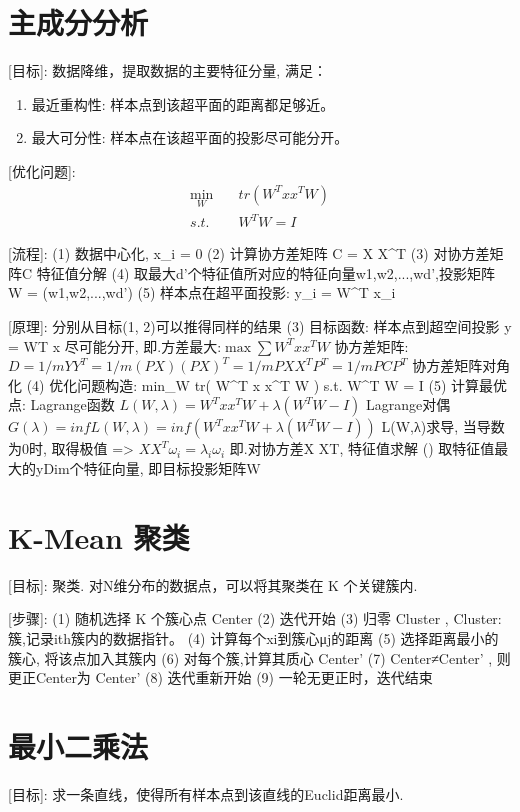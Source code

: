 \documentclass{article}
\title{}\date{} \setlength{\parindent}{0pt} \linespread{1.25}
\begin{document}
\section{主成分分析}
		[目标]:
			数据降维，提取数据的主要特征分量, 满足：
    			\begin{enumerate}
    			    \item 最近重构性: 样本点到该超平面的距离都足够近。
    			    \item 最大可分性: 样本点在该超平面的投影尽可能分开。
    			\end{enumerate}
			
		[优化问题]:
    		\begin{align*}
    			\min_W  &\quad	tr( W^T x x^T W )\\
    			s.t.    &\quad	W^T W = I
    		\end{align*}
			
		[流程]:
			(1) 数据中心化, \sum \vec x_i = 0
			(2) 计算协方差矩阵 C = X X^T
			(3) 对协方差矩阵C 特征值分解
			(4) 取最大d'个特征值所对应的特征向量{w1,w2,...,wd'},投影矩阵 W = (w1,w2,...,wd')
			(5) 样本点在超平面投影: y_i = W^T x_i
			
		[原理]:
				分别从目标(1, 2)可以推得同样的结果
			(3)	目标函数: 样本点到超空间投影 y = WT x 尽可能分开, 即.方差最大:$\max \sum W^T x x^T W$
				协方差矩阵:
					$D = 1/m Y Y^T = 1/m (PX) (PX)^T = 1/m P X X^T P^T = 1/m P C P^T$
				协方差矩阵对角化
			(4) 优化问题构造:
					min_W		tr( W^T x x^T W )
					s.t.		W^T W = I
			(5) 计算最优点:
				Lagrange函数 $L(W,λ) = W^T x x^T W + λ( W^T W - I )$
				Lagrange对偶 $G(λ) = inf L(W,λ) = inf (W^T x x^T W + λ( W^T W - I ))$
				L(W,λ)求导, 当导数为0时, 取得极值
				=>	$X X^T ω_i = λ_i ω_i$
				即.对协方差X XT, 特征值求解
			()	取特征值最大的yDim个特征向量, 即目标投影矩阵W


\section{K-Mean 聚类}
		[目标]:
			聚类. 对N维分布的数据点，可以将其聚类在 K 个关键簇内.
			
		[步骤]:
			(1) 随机选择 K 个簇心点 Center
			(2) 迭代开始
				(3) 归零 Cluster , Cluster: 簇,记录ith簇内的数据指针。
				(4) 计算每个xi到簇心μj的距离
					(5) 选择距离最小的簇心, 将该点加入其簇内
				(6) 对每个簇,计算其质心 Center'
				(7) Center≠Center' , 则更正Center为 Center'
				(8) 迭代重新开始
			(9) 一轮无更正时，迭代结束

\section{最小二乘法}
		[目标]:
			求一条直线，使得所有样本点到该直线的Euclid距离最小.
			
\end{document}
